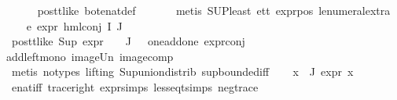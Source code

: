 \begin{isabellebody}
\ \ \ \ \isamarkupfalse%
\ pos{\isacharunderscore}{\kern0pt}tt{\isacharunderscore}{\kern0pt}like\ bot{\isacharunderscore}{\kern0pt}enat{\isacharunderscore}{\kern0pt}def\ \isanewline
\ \ \ \ \isamarkupfalse%
\ {\isacharparenleft}{\kern0pt}metis\ SUP{\isacharunderscore}{\kern0pt}least\ e{}{\isacharunderscore}{\kern0pt}tt\ expr{\isacharunderscore}{\kern0pt}{}{\isacharunderscore}{\kern0pt}pos\ le{\isacharunderscore}{\kern0pt}numeral{\isacharunderscore}{\kern0pt}extra{\isacharparenleft}{\kern0pt}{}{\isacharparenright}{\kern0pt}{\isacharparenright}{\kern0pt}\ \isanewline
\ \ \isamarkupfalse%
\ e{}{\isacharcolon}{\kern0pt}\ {\isachardoublequoteopen}expr{\isacharunderscore}{\kern0pt}{}\ {\isacharparenleft}{\kern0pt}hml{\isacharunderscore}{\kern0pt}conj\ I\ J\ {\isasymPhi}{\isacharparenright}{\kern0pt}\ {\isasymle}\ {}{\isachardoublequoteclose}\isanewline
\ \ \ \ \isamarkupfalse%
\ pos{\isacharunderscore}{\kern0pt}tt{\isacharunderscore}{\kern0pt}like\ {\isacartoucheopen}Sup\ {\isacharparenleft}{\kern0pt}expr{\isacharunderscore}{\kern0pt}{}\ {\isacharbackquote}{\kern0pt}\ {\isasymPhi}\ {\isacharbackquote}{\kern0pt}\ J{\isacharparenright}{\kern0pt}\ {\isasymle}\ {}{\isacartoucheclose}\ one{\isacharunderscore}{\kern0pt}add{\isacharunderscore}{\kern0pt}one\ expr{\isacharunderscore}{\kern0pt}{}{\isacharunderscore}{\kern0pt}conj\isanewline
add{\isacharunderscore}{\kern0pt}left{\isacharunderscore}{\kern0pt}mono\ image{\isacharunderscore}{\kern0pt}Un\ image{\isacharunderscore}{\kern0pt}comp\isanewline
\ \ \ \ \isamarkupfalse%
\ {\isacharparenleft}{\kern0pt}metis\ {\isacharparenleft}{\kern0pt}no{\isacharunderscore}{\kern0pt}types{\isacharcomma}{\kern0pt}\ lifting{\isacharparenright}{\kern0pt}\ Sup{\isacharunderscore}{\kern0pt}union{\isacharunderscore}{\kern0pt}distrib\ sup{\isachardot}{\kern0pt}bounded{\isacharunderscore}{\kern0pt}iff{\isacharparenright}{\kern0pt}\isanewline
\ \ \isamarkupfalse%
\ {\isachardoublequoteopen}{\isasymforall}x{\isasymin}{\isasymPhi}\ {\isacharbackquote}{\kern0pt}\ J{\isachardot}{\kern0pt}\ expr{\isacharunderscore}{\kern0pt}{}\ x\ {\isasymle}\ {}{\isachardoublequoteclose}\isanewline
\ \ \ \ \isamarkupfalse%
\ enat{\isacharunderscore}{\kern0pt}{}{\isacharunderscore}{\kern0pt}iff{\isacharparenleft}{\kern0pt}{}{\isacharparenright}{\kern0pt}\ trace{\isacharunderscore}{\kern0pt}right\ expr{\isachardot}{\kern0pt}simps\ less{\isacharunderscore}{\kern0pt}eq{\isacharunderscore}{\kern0pt}t{\isachardot}{\kern0pt}simps\ neg{\isacharunderscore}{\kern0pt}trace\isanewline

\end{isabellebody}
